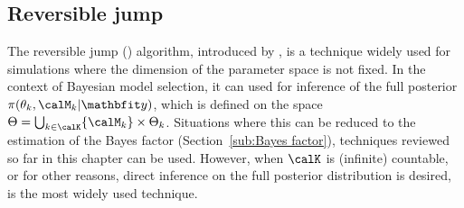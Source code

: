 \subsection{Reversible jump \protect\mcmc}
\label{sub:Reversible jump mcmc}

The reversible jump \mcmc (\rjmcmc) algorithm, introduced by
\cite{Green:1995dg}, is a technique widely used for simulations where the
dimension of the parameter space is not fixed. In the context of Bayesian
model selection, it can used for inference of the full posterior
$\pi(\theta_k,\calM_k|\data)$, which is defined on the space $\Theta =
\bigcup_{k\in\calK}\{\calM_k\}\times\Theta_k$. Situations where this can be
reduced to the estimation of the Bayes factor (Section~\ref{sub:Bayes
  factor}), techniques reviewed so far in this chapter can be used. However,
when $\calK$ is (infinite) countable, or for other reasons, direct inference
on the full posterior distribution is desired, \rjmcmc is the most widely used
technique.


